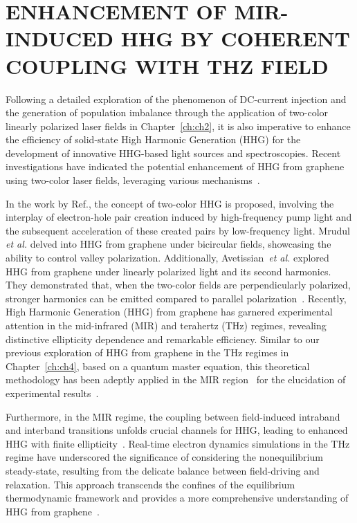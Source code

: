 \chapter{ENHANCEMENT OF MIR-INDUCED HHG BY COHERENT COUPLING WITH THZ FIELD \label{ch:ch5}}

Following a detailed exploration of the phenomenon of DC-current injection and the generation of
population imbalance through the application of two-color linearly polarized laser fields in
Chapter~\ref{ch:ch2}, it is also imperative to enhance the efficiency of solid-state High Harmonic Generation (HHG) for the development of innovative HHG-based light sources and spectroscopies. Recent investigations have indicated the potential enhancement of HHG from graphene using two-color laser fields, leveraging various mechanisms~\cite{PhysRevB.100.035434,Mrudul:21,PhysRevB.105.195405}.

In the work by Ref.\cite{PhysRevB.100.035434}, the concept of two-color HHG is proposed, involving the interplay of electron-hole pair creation induced by high-frequency pump light and the subsequent acceleration of these created pairs by low-frequency light. Mrudul \textit{et al.} delved into HHG from graphene under bicircular fields, showcasing the ability to control valley polarization\cite{Mrudul:21}. Additionally, Avetissian~\textit{et al.} explored HHG from graphene under linearly polarized light and its second harmonics. They demonstrated that, when the two-color fields are perpendicularly polarized, stronger harmonics can be emitted compared to parallel polarization~\cite{PhysRevB.105.195405}.
Recently, High Harmonic Generation (HHG) from graphene has garnered experimental attention in the
mid-infrared (MIR)\cite{doi:10.1126/science.aam8861,cha2022gate} and terahertz
(THz)\cite{Hafez2018,doi:10.1126/sciadv.abf9809} regimes, revealing distinctive ellipticity
dependence and remarkable efficiency. Similar to our previous exploration of HHG from graphene in
the THz regimes in Chapter~\ref{ch:ch4}, based on a quantum master equation, this theoretical methodology has been adeptly applied in the MIR region~\cite{PhysRevB.103.L041408} for the elucidation of experimental results~\cite{doi:10.1126/science.aam8861,cha2022gate}.

Furthermore, in the MIR regime, the coupling between field-induced intraband and interband transitions unfolds crucial channels for HHG, leading to enhanced HHG with finite ellipticity~\cite{PhysRevB.103.L041408}. Real-time electron dynamics simulations in the THz regime have underscored the significance of considering the nonequilibrium steady-state, resulting from the delicate balance between field-driving and relaxation. This approach transcends the confines of the equilibrium thermodynamic framework and provides a more comprehensive understanding of HHG from graphene~\cite{PhysRevB.106.024313}.

